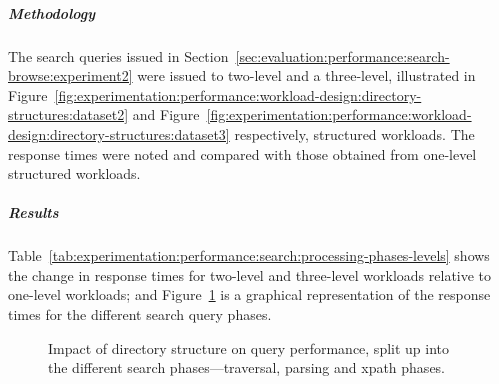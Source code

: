 \subparagraph{Methodology}

The search queries issued in Section~\ref{sec:evaluation:performance:search-browse:experiment2} were issued to two-level and a three-level, illustrated in Figure~\ref{fig:experimentation:performance:workload-design:directory-structures:dataset2} and Figure~\ref{fig:experimentation:performance:workload-design:directory-structures:dataset3} respectively, structured workloads. The response times were noted and compared with those obtained from one-level structured workloads.

\subparagraph{Results}

Table~\ref{tab:experimentation:performance:search:processing-phases-levels} shows the change in response times for two-level and three-level workloads relative to one-level workloads; and Figure~\ref{fig:experimentation:performance:search:processing-phases-levels} is a graphical representation of the response times for the different search query phases.

\tablespacing

\bodyspacing


\begin{figure}
 \centering
 \framebox[\textwidth]{%

 }
 \caption[Impact of structure on query performance]{Impact of directory structure on query performance, split up into the different search phases---traversal, parsing and xpath phases.}
 \label{fig:experimentation:performance:search:processing-phases-levels}
\end{figure}

